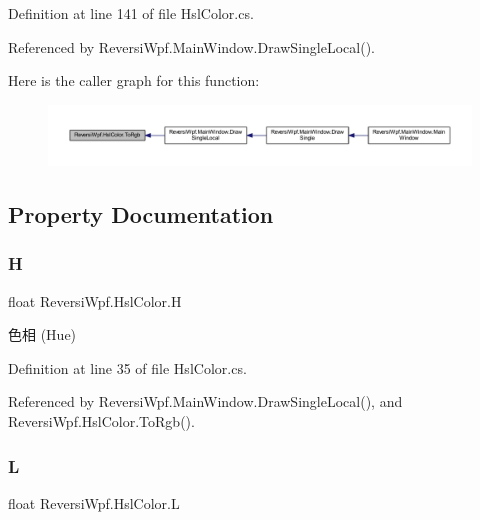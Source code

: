 Definition at line 141 of file Hsl\+Color.\+cs.



Referenced by Reversi\+Wpf.\+Main\+Window.\+Draw\+Single\+Local().

Here is the caller graph for this function\+:
\nopagebreak
\begin{figure}[H]
\begin{center}
\leavevmode
\includegraphics[width=350pt]{class_reversi_wpf_1_1_hsl_color_aba11bae61cc67fcece49cbc4b18db8b1_icgraph}
\end{center}
\end{figure}


\subsection{Property Documentation}
\mbox{\label{class_reversi_wpf_1_1_hsl_color_a8b56c1b47fa4880e598829435ca25122}} 
\subsubsection{\texorpdfstring{H}{H}}
{\footnotesize\ttfamily float Reversi\+Wpf.\+Hsl\+Color.\+H\hspace{0.3cm}{\ttfamily [get]}}



色相 (Hue) 



Definition at line 35 of file Hsl\+Color.\+cs.



Referenced by Reversi\+Wpf.\+Main\+Window.\+Draw\+Single\+Local(), and Reversi\+Wpf.\+Hsl\+Color.\+To\+Rgb().

\mbox{\label{class_reversi_wpf_1_1_hsl_color_a8d465b3c48d716f819d8a53a4eca3d93}} 
\subsubsection{\texorpdfstring{L}{L}}
{\footnotesize\ttfamily float Reversi\+Wpf.\+Hsl\+Color.\+L\hspace{0.3cm}{\ttfamily [get]}}



